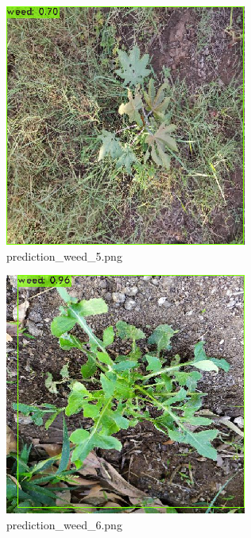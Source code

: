 \documentclass[12pt]{exam}
\begin{document}
\begin{questions}
\begin{parts}
		\hfill

		\begin{figure}[H]
			\includegraphics[width=\textwidth]{images-yolo/prediction_weed_5.png}
			\caption{prediction\_weed\_5.png}
		\end{figure}

		\hfill

		\begin{figure}[H]
			\includegraphics[width=\textwidth]{images-yolo/prediction_weed_6.png}
			\caption{prediction\_weed\_6.png}
		\end{figure}



\end{parts}
\end{questions}
\end{document}
